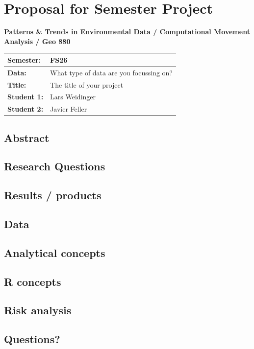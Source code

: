 \documentclass[
  letterpaper,
  DIV=11,
  numbers=noendperiod]{scrartcl}
\author{}
\date{}
\begin{document}
\section{Proposal for Semester
Project}\label{proposal-for-semester-project}

\textbf{Patterns \& Trends in Environmental Data / Computational
Movement Analysis / Geo 880}

\begin{longtable}[]{@{}ll@{}}
\toprule\noalign{}
Semester: & FS26 \\
\midrule\noalign{}
\endhead
\bottomrule\noalign{}
\endlastfoot
\textbf{Data:} & What type of data are you focussing on? \\
\textbf{Title:} & The title of your project \\
\textbf{Student 1:} & Lars Weidinger \\
\textbf{Student 2:} & Javier Feller \\
\end{longtable}

\subsection{Abstract}\label{abstract}

\subsection{Research Questions}\label{research-questions}

\subsection{Results / products}\label{results-products}

\subsection{Data}\label{data}

\subsection{Analytical concepts}\label{analytical-concepts}

\subsection{R concepts}\label{r-concepts}

\subsection{Risk analysis}\label{risk-analysis}

\subsection{Questions?}\label{questions}
\end{document}

